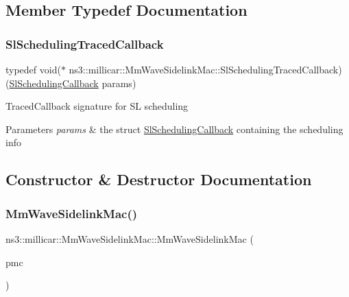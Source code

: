 \subsection{Member Typedef Documentation}
\mbox{\label{classns3_1_1millicar_1_1MmWaveSidelinkMac_ad5c7416a57edcebe1e57106b503831c7}} 
\subsubsection{\texorpdfstring{Sl\+Scheduling\+Traced\+Callback}{SlSchedulingTracedCallback}}
{\footnotesize\ttfamily typedef void($\ast$  ns3\+::millicar\+::\+Mm\+Wave\+Sidelink\+Mac\+::\+Sl\+Scheduling\+Traced\+Callback) (\hyperlink{structns3_1_1millicar_1_1SlSchedulingCallback}{Sl\+Scheduling\+Callback} params)}

Traced\+Callback signature for SL scheduling


\begin{DoxyParams}{Parameters}
{\em params} & the struct \hyperlink{structns3_1_1millicar_1_1SlSchedulingCallback}{Sl\+Scheduling\+Callback} containing the scheduling info \\
\hline
\end{DoxyParams}


\subsection{Constructor \& Destructor Documentation}
\mbox{\label{classns3_1_1millicar_1_1MmWaveSidelinkMac_ae4a82035baa66ee6c17d9b2094bacd24}} 
\subsubsection{\texorpdfstring{Mm\+Wave\+Sidelink\+Mac()}{MmWaveSidelinkMac()}}
{\footnotesize\ttfamily ns3\+::millicar\+::\+Mm\+Wave\+Sidelink\+Mac\+::\+Mm\+Wave\+Sidelink\+Mac (\begin{DoxyParamCaption}\item[{Ptr$<$ mmwave\+::\+Mm\+Wave\+Phy\+Mac\+Common $>$}]{pmc }\end{DoxyParamCaption})}



